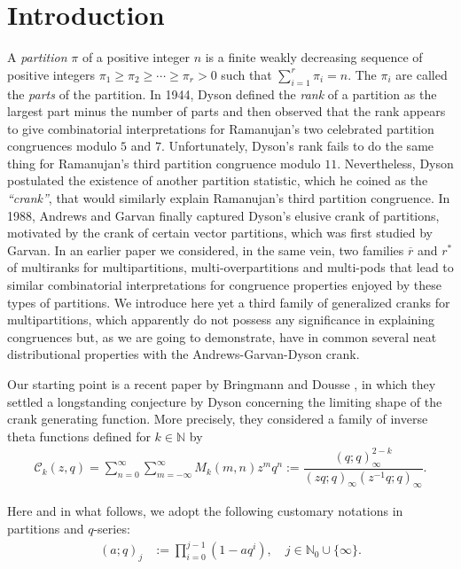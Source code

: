 \documentclass[12pt]{amsart}
\numberwithin{equation}{section}
\theoremstyle{plain}
\theoremstyle{definition}
\begin{document}
\section{Introduction}\label{sec1}
A \emph{partition} \cite{Andr2} $\pi$ of a positive integer $n$ is a finite weakly decreasing sequence of positive integers $\pi_{1}\geq\pi_{2}\geq\cdots\geq\pi_{r}>0$ such that $\sum_{i=1}^{r}\pi_{i}=n$. The $\pi_{i}$ are called the \emph{parts} of the partition. In 1944, Dyson \cite{Dys} defined the \emph{rank} of a partition as the largest part minus the number of parts and then observed that the rank appears to give combinatorial interpretations for Ramanujan's two celebrated partition congruences modulo $5$ and $7$. Unfortunately, Dyson's rank fails to do the same thing for Ramanujan's third partition congruence modulo $11$. Nevertheless, Dyson \cite{Dys} postulated the existence of another partition statistic, which he coined as the \emph{``crank''}, that would similarly explain Ramanujan's third partition
congruence. In 1988, Andrews and Garvan \cite{A-G} finally captured Dyson's elusive crank of partitions, motivated by the crank of certain vector partitions, which was first studied by Garvan\cite{Gar1}. In an earlier paper \cite{FT} we considered, in the same vein, two families $\overline{r}$ and $r^*$ of multiranks for multipartitions, multi-overpartitions and multi-pods that lead to similar combinatorial interpretations for congruence properties enjoyed by these types of partitions. We introduce here yet a third family of generalized cranks for multipartitions, which apparently do not possess any significance in explaining congruences but, as we are going to demonstrate, have in common several neat distributional properties with the Andrews-Garvan-Dyson crank.

Our starting point is a recent paper by Bringmann and Dousse \cite{BD}, in which they settled a longstanding conjecture by Dyson \cite[p.~172]{Dys2} concerning the limiting shape of the crank generating function. More precisely, they considered a family of inverse theta functions defined for $k\in\mathbb{N}$ by
\begin{align}\label{gf:k colored part crank}
\mathcal{C}_{k}(z,q)=\sum_{n=0}^{\infty}\sum_{m=-\infty}^{\infty}M_{k}(m,n)z^{m}q^{n}:=\dfrac{(q;q)_{\infty}^{2-k}}{(zq;q)_{\infty}(z^{-1}q;q)_{\infty}}.
\end{align}

Here and in what follows, we adopt the following customary notations \cite{Andr2} in partitions and $q$-series:
\begin{align*}
(a;q)_{j} &:=\prod_{i=0}^{j-1}(1-aq^{i}), \quad j\in\mathbb{N}_0\cup\{\infty\}.
\end{align*}
\end{document}
